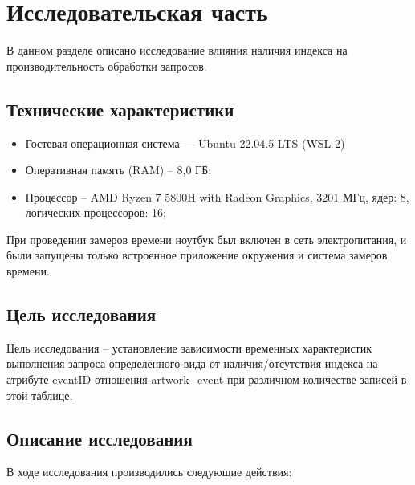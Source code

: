 \chapter{Исследовательская часть}

В данном разделе описано исследование влияния наличия индекса на производительность обработки запросов.

\section{Технические характеристики}
\begin{itemize}
	\item {Гостевая операционная система --- Ubuntu 22.04.5 LTS (WSL 2)}
	\item {Оперативная память (RAM) -- 8,0 ГБ;}
	\item {Процессор -- AMD Ryzen 7 5800H with Radeon Graphics, 3201 МГц, ядер: 8, логических процессоров: 16;}
\end{itemize}

При проведении замеров времени ноутбук был включен в сеть электропитания, и были запущены только встроенное приложение окружения и система замеров времени.

\section{Цель исследования}
Цель исследования -- установление зависимости временных характеристик выполнения запроса определенного вида от наличия/отсутствия индекса на атрибуте eventID отношения artwork\_event при различном количестве записей в этой таблице.

\section{Описание исследования}

В ходе исследования производились следующие действия:

